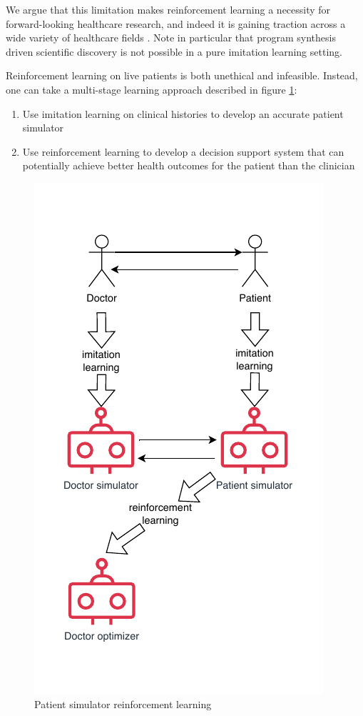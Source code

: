 We argue that this limitation makes reinforcement learning a necessity for forward-looking healthcare research, and indeed it is gaining traction across a wide variety of healthcare fields \cite{yuReinforcementLearningHealthcare2021}.
Note in particular that program synthesis driven scientific discovery is not possible in a pure imitation learning setting.

Reinforcement learning on live patients is both unethical and infeasible.
Instead, one can take a multi-stage learning approach described in figure \ref{fig:RLCEPS}: 
\begin{enumerate}
  \item Use imitation learning on clinical histories to develop an accurate patient simulator
  \item Use reinforcement learning to develop a decision support system that can potentially achieve better health outcomes for the patient than the clinician
\end{enumerate}

\begin{figure}
  \centering
  \includegraphics[width=0.9\linewidth]{images/rlceps.pdf}
  \caption{Patient simulator reinforcement learning}
  \label{fig:RLCEPS}
\end{figure}

